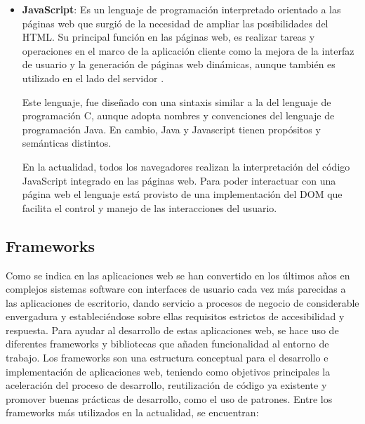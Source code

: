\begin{itemize}
\item \textbf{JavaScript}: Es un lenguaje de programación interpretado orientado a las páginas web que surgió de la necesidad de ampliar las posibilidades del HTML. Su principal función en las páginas web, es realizar tareas y operaciones en el marco de la aplicación cliente como la mejora de la interfaz de usuario y la generación de páginas web dinámicas, aunque también es utilizado en el lado del servidor .

Este lenguaje, fue diseñado con una sintaxis similar a la del lenguaje de programación C, aunque adopta nombres y convenciones del lenguaje de programación Java. En cambio, Java y Javascript tienen propósitos y semánticas distintos.

En la actualidad, todos los navegadores realizan la interpretación del código JavaScript integrado en las páginas web. Para poder interactuar con una página web el lenguaje está provisto de una implementación del DOM que facilita el control y manejo de las interacciones del usuario.

\end{itemize}

\subsection{Frameworks}
\label{sec:frameworks}

Como se indica en \cite{garrido2004arquitectura} las aplicaciones web se han convertido en los últimos años en complejos sistemas software con interfaces de usuario cada vez más parecidas a las aplicaciones de escritorio, dando servicio a procesos de negocio de considerable envergadura y estableciéndose sobre ellas requisitos estrictos de accesibilidad y respuesta. Para ayudar al desarrollo de estas aplicaciones web, se hace uso de diferentes frameworks y bibliotecas que añaden funcionalidad al entorno de trabajo. Los frameworks son una estructura conceptual para el desarrollo e implementación de aplicaciones web, teniendo como objetivos principales la aceleración del proceso de desarrollo, reutilización de código ya existente y promover buenas prácticas de desarrollo, como el uso de patrones. Entre los frameworks más utilizados en la actualidad, se encuentran:

